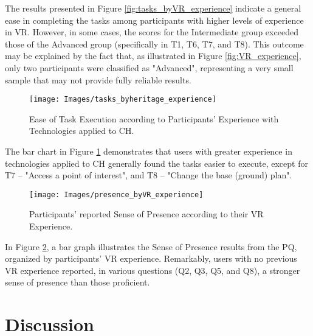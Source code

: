 The results presented in Figure \ref{fig:tasks_byVR_experience} indicate a general ease in completing the tasks among participants with higher levels of experience in \gls{VR}. 
However, in some cases, the scores for the Intermediate group exceeded those of the Advanced group (specifically in T1, T6, T7, and T8). 
This outcome may be explained by the fact that, as illustrated in Figure \ref{fig:VR_experience}, only two participants were classified as "Advanced", representing a very small sample that may not provide fully reliable results.

\begin{figure}[h!]
    \centering
    \texttt{[image: Images/tasks\_byheritage\_experience]}
    \caption{Ease of Task Execution according to Participants’ Experience with Technologies applied to \gls{CH}.} 
    \label{fig:tasks_byheritage_experience}
\end{figure}

The bar chart in Figure \ref{fig:tasks_byheritage_experience} demonstrates that users with greater experience in technologies applied to \gls{CH} generally found the tasks easier to execute, except for T7 – "Access a point of interest", and T8 – "Change the base (ground) plan".

\begin{figure}[h!]
    \centering
    \texttt{[image: Images/presence\_byVR\_experience]}
    \caption{Participants’ reported Sense of Presence according to their \gls{VR} Experience.} 
    \label{fig:presence_byVR_experience}
\end{figure}


In Figure \ref{fig:presence_byVR_experience}, a bar graph illustrates the Sense of Presence results from the \gls{PQ}, organized by participants’ \gls{VR} experience. 
Remarkably, users with no previous \gls{VR} experience reported, in various questions (Q2, Q3, Q5, and Q8), a stronger sense of presence than those proficient.

\FloatBarrier
\section{Discussion}
\label{sec:eval_discussion}


